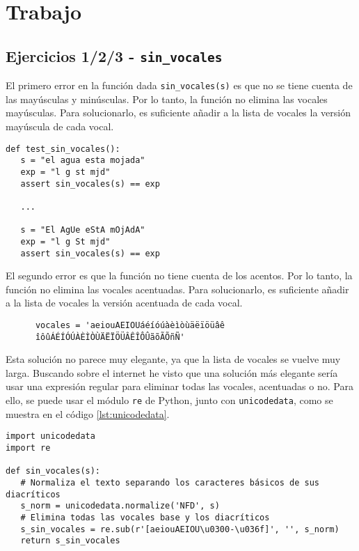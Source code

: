\chapter{Trabajo}

\lstset{language=python}


\section{Ejercicios 1/2/3 - \texttt{sin\_vocales}}

\begin{paracol}{2}
   El primero error en la función dada \lstinline|sin_vocales(s)| es que no se tiene cuenta de las mayúsculas y minúsculas. Por lo tanto, la función no elimina las vocales mayúsculas. Para solucionarlo, es suficiente añadir a la lista de vocales la versión mayúscula de cada vocal.

   \switchcolumn

   \begin{lstlisting}
def test_sin_vocales():
   s = "el agua esta mojada"
   exp = "l g st mjd"
   assert sin_vocales(s) == exp

   ...
      
   s = "El AgUe eStA mOjAdA"
   exp = "l g St mjd"
   assert sin_vocales(s) == exp
   \end{lstlisting}
\end{paracol}

\begin{paracol}{2}
   El segundo error es que la función no tiene cuenta de los acentos. Por lo tanto, la función no elimina las vocales acentuadas. Para solucionarlo, es suficiente añadir a la lista de vocales la versión acentuada de cada vocal.

   \begin{verbatim}
      vocales = 'aeiouAEIOUáéíóúàèìòùäëïöüâê
      îôûÁÉÍÓÚÀÈÌÒÙÄËÏÖÜÂÊÎÔÛãõÃÕñÑ'
   \end{verbatim}

   Esta solución no parece muy elegante, ya que la lista de vocales se vuelve muy larga. Buscando sobre el internet he visto que una solución más elegante sería usar una expresión regular para eliminar todas las vocales, acentuadas o no. Para ello, se puede usar el módulo \lstinline|re| de Python, junto con \lstinline|unicodedata|, como se muestra en el código \ref{lst:unicodedata}.

   \switchcolumn
   \begin{verbatim}
import unicodedata
import re

def sin_vocales(s):
   # Normaliza el texto separando los caracteres básicos de sus diacríticos
   s_norm = unicodedata.normalize('NFD', s)
   # Elimina todas las vocales base y los diacríticos
   s_sin_vocales = re.sub(r'[aeiouAEIOU\u0300-\u036f]', '', s_norm)
   return s_sin_vocales
   \end{verbatim}
\end{paracol}